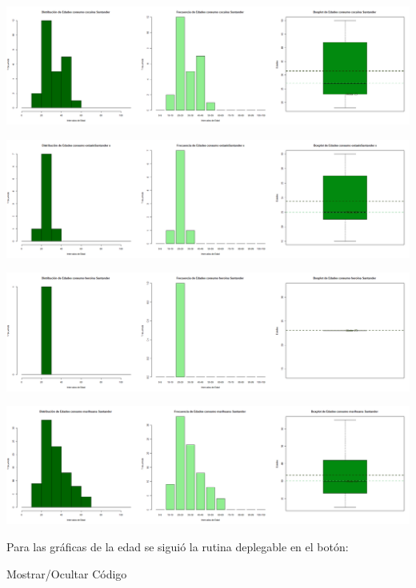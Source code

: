 \documentclass[
]{article}
\begin{document}
\includegraphics{images/cocaina edad santander.png}

\includegraphics{images/extasis edad santander.png}

\includegraphics{images/heroina edad santander.png}

\includegraphics{images/marihuana edad santander.png}

Para las gráficas de la edad se siguió la rutina deplegable en el botón:

Mostrar/Ocultar Código
\end{document}
